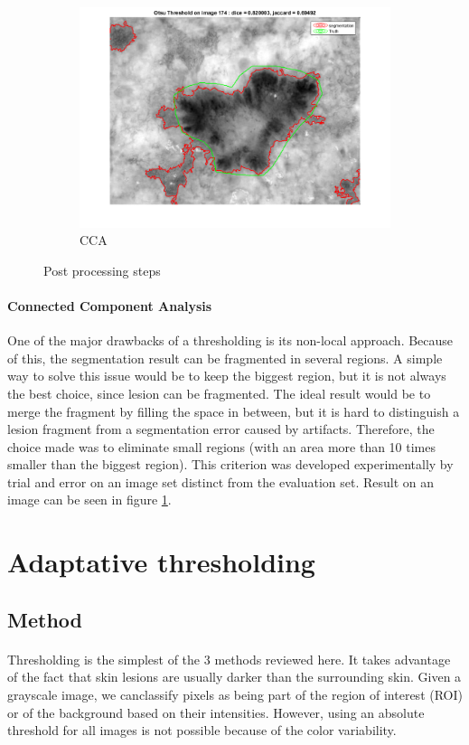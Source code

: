 \documentclass[a4paper,10pt]{article}
\begin{document}
\begin{figure}[h]
\begin{subfigure}{0.32\linewidth}
		\includegraphics[width=0.99\linewidth]{../results/postproc/otsu_filling_CCA_174}
		\caption{CCA}
		\label{fig:postproc-CCA}
	\end{subfigure}
	\caption{Post processing steps}
	\label{fig:postproc}
\end{figure}

\paragraph{Connected Component Analysis} One of the major drawbacks of a thresholding is its non-local approach. Because of this, the segmentation result can be fragmented in several regions. A simple way to solve this issue would be to keep the biggest region, but it is not always the best choice, since lesion can be fragmented. The ideal result would be to merge the fragment by filling the space in between, but it is hard to distinguish a lesion fragment from a segmentation error caused by artifacts. Therefore, the choice made was to eliminate small regions (with an area more than 10 times smaller than the biggest region). This criterion was developed experimentally by trial and error on an image set distinct from the evaluation set. Result on an image can be seen in figure \ref{fig:postproc-CCA}.


\section{Adaptative thresholding}
\subsection{Method}
\paragraph{}
Thresholding is the simplest of the 3 methods reviewed here. It takes advantage of the fact that skin lesions are usually darker than the surrounding skin. Given a grayscale image, we canclassify pixels as being part of the region of interest (ROI) or of the 
background based on their intensities. However, using an absolute threshold for all images is not possible because of the color variability. 
\end{document}
